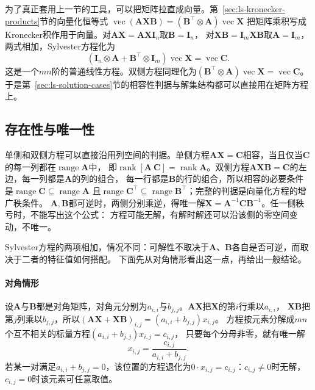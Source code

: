 为了真正套用上一节的工具，可以把矩阵拉直成向量。第~\ref{sec:ls-kronecker-products}节的向量化恒等式
$\operatorname{vec}(\bm A\bm X\bm B)=(\bm B^\top\otimes\bm A)\operatorname{vec}\bm X$
把矩阵乘积写成Kronecker积作用于向量。对$\bm A\bm X=\bm A\bm X\bm I_n$取$\bm B=\bm I_n$，
对$\bm X\bm B=\bm I_m\bm X\bm B$取$\bm A=\bm I_m$，两式相加，Sylvester方程化为
\begin{equation}
 (\bm I_n\otimes\bm A+\bm B^\top\otimes\bm I_m)\operatorname{vec}\bm X
 =\operatorname{vec}\bm C.
 \label{eq:ls-sylvester-vectorized}
\end{equation}
这是一个$mn$阶的普通线性方程。双侧方程同理化为$(\bm B^\top\otimes\bm A)\operatorname{vec}\bm X=\operatorname{vec}\bm C$。
于是第~\ref{sec:ls-solution-cases}节的相容性判据与解集结构都可以直接用在矩阵方程上。

\subsection{存在性与唯一性}
\label{sec:ls-matrix-equation-existence}

单侧和双侧方程可以直接沿用列空间的判据。单侧方程$\bm A\bm X=\bm C$相容，当且仅当$\bm C$的每一列都在$\operatorname{range}\bm A$中，
即$\operatorname{rank}[\bm A\ \bm C]=\operatorname{rank}\bm A$。双侧方程$\bm A\bm X\bm B=\bm C$的左边，每一列都是$\bm A$的列的组合，
每一行都是$\bm B$的行的组合，所以相容的必要条件是$\operatorname{range}\bm C\subseteq\operatorname{range}\bm A$
且$\operatorname{range}\bm C^\top\subseteq\operatorname{range}\bm B^\top$；完整的判据是向量化方程的增广秩条件。
$\bm A,\bm B$都可逆时，两侧分别乘逆，得唯一解$\bm X=\bm A^{-1}\bm C\bm B^{-1}$。任一侧秩亏时，不能写出这个公式：
方程可能无解，有解时解还可以沿该侧的零空间变动，不唯一。

Sylvester方程的两项相加，情况不同：可解性不取决于$\bm A$、$\bm B$各自是否可逆，而取决于二者的特征值如何搭配。
下面先从对角情形看出这一点，再给出一般结论。

\paragraph{对角情形}

设$\bm A$与$\bm B$都是对角矩阵，对角元分别为$a_{i,i}$与$b_{j,j}$。$\bm A\bm X$把$\bm X$的第$i$行乘以$a_{i,i}$，
$\bm X\bm B$把第$j$列乘以$b_{j,j}$，所以$(\bm A\bm X+\bm X\bm B)_{i,j}=(a_{i,i}+b_{j,j})x_{i,j}$。
方程按元素分解成$mn$个互不相关的标量方程$(a_{i,i}+b_{j,j})x_{i,j}=c_{i,j}$，
只要每个分母非零，就有唯一解
\begin{equation}
 x_{i,j}=\frac{c_{i,j}}{a_{i,i}+b_{j,j}}.
 \label{eq:ls-sylvester-diagonal-closed-form}
\end{equation}
若某一对满足$a_{i,i}+b_{j,j}=0$，该位置的方程退化为$0\cdot x_{i,j}=c_{i,j}$：$c_{i,j}\neq0$时无解，$c_{i,j}=0$时该元素可任意取值。


